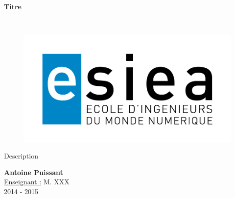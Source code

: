 \begin{titlepage}
      \begin{center}   
        \Huge
        \textbf{Titre}
        
        \LARGE
        ~
        
        
        \vfill
        \begin{figure}[H]
	    \centering
	    \begin{minipage}{0.9\textwidth}
		\centering
		\includegraphics[width=\textwidth]{./img/esiea.jpeg}
	    \end{minipage}\hfill
	\end{figure}
        \vfill
        
        \vspace{0.5cm}
        
        Description
        
        \vspace{2cm}
        \textbf{Antoine Puissant}\\
        \vspace{0.8cm}
        \Large
        \underline{Enseignant :} M. XXX\\
        \vspace{0.5cm}
        2014 - 2015%
        
    \end{center}
\end{titlepage}